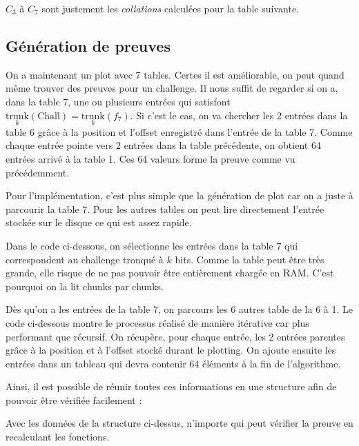$C_3$ à $C_7$ sont justement les \emph{collations} calculées pour la table suivante.

\subsection{Génération de preuves}

On a maintenant un plot avec 7 tables. Certes il est améliorable, on peut quand même trouver des preuves pour un challenge. Il nous suffit de regarder si on a, dans la table 7, une ou plusieurs entrées qui satisfont $\underset{k}{\mathrm{trunk}}(\mathrm{Chall})=\underset{k}{\mathrm{trunk}}(f_7)$. Si c'est le cas, on va chercher les 2 entrées dans la table 6 grâce à la position et l'offset enregistré dans l'entrée de la table 7. Comme chaque entrée pointe vers 2 entrées dans la table précédente, on obtient 64 entrées arrivé à la table 1. Ces 64 valeurs forme la preuve comme vu précédemment.

Pour l'implémentation, c'est plus simple que la génération de plot car on a juste à parcourir la  table 7. Pour les autres tables on peut lire directement l'entrée stockée sur le disque ce qui est assez rapide.

Dans le code ci-dessous, on sélectionne les entrées dans la table 7 qui correspondent au challenge tronqué à $k$ bits. Comme la table peut être très grande, elle risque de ne pas pouvoir être entièrement chargée en RAM. C'est pourquoi on la lit chunks par chunks.


Dès qu'on a les entrées de la table 7, on parcours les 6 autres table de la 6 à 1. Le code ci-dessous montre le processus réalisé de manière itérative car plus performant que récursif. On récupère, pour chaque entrée, les 2 entrées parentes grâce à la position et à l'offset stocké durant le plotting. On ajoute ensuite les entrées dans un tableau qui devra contenir 64 éléments à la fin de l'algorithme.


Ainsi, il est possible de réunir toutes ces informations en une structure afin de pouvoir être vérifiée facilement :


Avec les données de la structure ci-dessus, n'importe qui peut vérifier la preuve en recalculant les fonctions.

